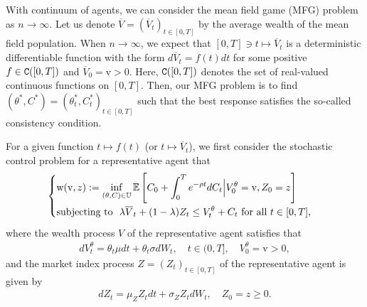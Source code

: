 \documentclass[11pt,times,letter]{article}
\newcommand{\Ex}{ \mathbb{E} }
\newcommand{\C}{{\tt{C}}}
\numberwithin{equation}{section}
\begin{document}
With continuum of agents, we can consider the mean field game (MFG) problem as $n\rightarrow\infty$. Let us denote $\overline{V}=(\overline{V}_t)_{t\in[0,T]}$ by the average wealth of the mean field population. When $n\rightarrow\infty$, we expect that $[0,T]\ni t\mapsto\overline{V}_t$ is a deterministic differentiable function with the form $d\overline{V}_t=f(t)dt$ for some positive $f\in\C([0,T])$ and $\overline{V}_0=\mathrm{v}>0$. Here, $\C([0,T])$ denotes the set of real-valued continuous functions on $[0,T]$. Then, our MFG problem is to find $(\theta^*,C^*)=(\theta_t^*,C_t^*)_{t\in[0,T]}$ such that the best response satisfies the so-called consistency condition. 


For a given function $t\mapsto f(t)$ (or $t\mapsto\overline{V}_t$), we first consider the stochastic control problem for a representative agent that  
\begin{align}\label{eq:mfg}
\begin{cases}
\displaystyle {\rm w}(\mathrm{v},z):=\text{$\inf_{(\theta,C)\in \mathbb{U}} \Ex\left[ C_0+ \int_0^{T} e^{-\rho t}dC_t\Big|V_0^{\theta}=\mathrm{v},Z_0=z \right]$}\\[1em]
\displaystyle \text{subjecting to\ \  $\lambda \overline{V}_t +(1-\lambda )Z_t\le V_t^{\theta}+C_t$ for all $t\in [0,T]$,}
\end{cases}
\end{align}
where the wealth process $V$ of the representative agent satisfies that
\begin{align}\label{eq:Vt-MFG}
dV_t^{\theta}=\theta_t \mu dt+\theta_t\sigma dW_t,\quad t\in (0,T],\quad V_0^{\theta}=\mathrm{v}>0,
\end{align}
and the market index process $Z=(Z_t)_{t \in [0,T]}$ of the representative agent is given by
\begin{align}\label{eq:Zt-MFG}
d Z_t=\mu_Z Z_t d t+\sigma_Z Z_t d W_t,\quad Z_0=z\geq0.
\end{align}
\end{document}

